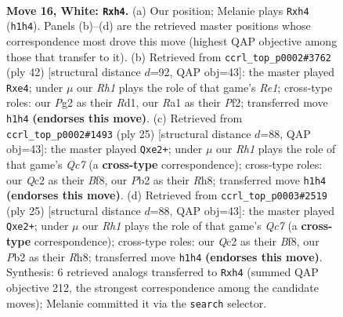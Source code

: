 \documentclass[11pt]{article}
\begin{document}
\clearpage

\begin{figure}[p]\centering
\begin{subfigure}{0.46\textwidth}\centering
\resizebox{\linewidth}{!}{%
\newchessgame
\chessboard[
  setfen={rnbq1k1r/5p2/8/pB1p3p/3Pp2b/8/PPQ2PP1/R3K1NR w KQ - 0 16},
  showmover=false,
  pgfstyle=straightmove, color=movearrow, markmove={h1-h4}
]}
\caption{}
\end{subfigure}\hfill
\begin{subfigure}{0.46\textwidth}\centering
\resizebox{\linewidth}{!}{%
\newchessgame
\chessboard[
  setfen={r3k2r/pq2bp2/1p2pp2/8/2P1b1Q1/1PB3P1/P4P2/3RR1K1 w kq - 0 22},
  showmover=false,
  pgfstyle=straightmove, color=movearrow, markmove={e1-e4}
]}
\caption{}
\end{subfigure}
\\[4pt]
\begin{subfigure}{0.46\textwidth}\centering
\resizebox{\linewidth}{!}{%
\newchessgame
\chessboard[
  setfen={r3kb1r/1ppn2pp/8/1N6/3PpP2/8/PPq1Q1PP/R1B1K2R b KQkq - 0 13},
  showmover=false,
  pgfstyle=straightmove, color=movearrow, markmove={c2-e2}
]}
\caption{}
\end{subfigure}\hfill
\begin{subfigure}{0.46\textwidth}\centering
\resizebox{\linewidth}{!}{%
\newchessgame
\chessboard[
  setfen={r3kb1r/1ppn2pp/8/1N6/3PpP2/8/PPq1Q1PP/R1B1K2R b KQkq - 0 13},
  showmover=false,
  pgfstyle=straightmove, color=movearrow, markmove={c2-e2}
]}
\caption{}
\end{subfigure}
\caption{\textbf{Move 16, White: \texttt{Rxh4}.} (a) Our position; Melanie plays \texttt{Rxh4} (\texttt{h1h4}). Panels (b)--(d) are the retrieved master positions whose correspondence most drove this move (highest QAP objective among those that transfer to it). (b) Retrieved from \texttt{ccrl\_top\_p0002\#3762} (ply 42) [structural distance $d$=92, QAP obj=43]: the master played \texttt{Rxe4}; under $\mu$ our \emph{Rh1} plays the role of that game's \emph{Re1}; cross-type roles: our \emph{P}g2 as their \emph{R}d1, our \emph{R}a1 as their \emph{P}f2; transferred move \texttt{h1h4} \textbf{(endorses this move)}. (c) Retrieved from \texttt{ccrl\_top\_p0002\#1493} (ply 25) [structural distance $d$=88, QAP obj=43]: the master played \texttt{Qxe2+}; under $\mu$ our \emph{Rh1} plays the role of that game's \emph{Qc7} (a \textbf{cross-type} correspondence); cross-type roles: our \emph{Q}c2 as their \emph{B}f8, our \emph{P}b2 as their \emph{R}h8; transferred move \texttt{h1h4} \textbf{(endorses this move)}. (d) Retrieved from \texttt{ccrl\_top\_p0003\#2519} (ply 25) [structural distance $d$=88, QAP obj=43]: the master played \texttt{Qxe2+}; under $\mu$ our \emph{Rh1} plays the role of that game's \emph{Qc7} (a \textbf{cross-type} correspondence); cross-type roles: our \emph{Q}c2 as their \emph{B}f8, our \emph{P}b2 as their \emph{R}h8; transferred move \texttt{h1h4} \textbf{(endorses this move)}. Synthesis: 6 retrieved analogs transferred to \texttt{Rxh4} (summed QAP objective 212, the strongest correspondence among the candidate moves); Melanie committed it via the \texttt{search} selector.}
\label{fig:thought-m30}
\end{figure}
\end{document}
